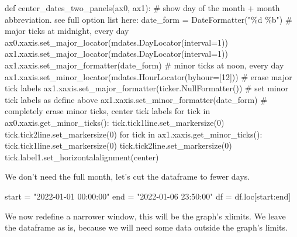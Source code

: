 \documentclass[
  letterpaper,
  DIV=11,
  numbers=noendperiod,
  oneside]{scrreprt}
\newenvironment{Shaded}{\begin{snugshade}}{\end{snugshade}}
\newcommand{\CommentTok}[1]{\textcolor[rgb]{0.37,0.37,0.37}{#1}}
\newcommand{\ControlFlowTok}[1]{\textcolor[rgb]{0.00,0.23,0.31}{#1}}
\newcommand{\DecValTok}[1]{\textcolor[rgb]{0.68,0.00,0.00}{#1}}
\newcommand{\KeywordTok}[1]{\textcolor[rgb]{0.00,0.23,0.31}{#1}}
\newcommand{\NormalTok}[1]{\textcolor[rgb]{0.00,0.23,0.31}{#1}}
\newcommand{\OperatorTok}[1]{\textcolor[rgb]{0.37,0.37,0.37}{#1}}
\newcommand{\SpecialCharTok}[1]{\textcolor[rgb]{0.37,0.37,0.37}{#1}}
\newcommand{\StringTok}[1]{\textcolor[rgb]{0.13,0.47,0.30}{#1}}
\begin{document}
\begin{Shaded}
\begin{Highlighting}[]
\KeywordTok{def}\NormalTok{ center\_dates\_two\_panels(ax0, ax1):}
    \CommentTok{\# show day of the month + month abbreviation. see full option list here:}
\NormalTok{    date\_form }\OperatorTok{=}\NormalTok{ DateFormatter(}\StringTok{"}\SpecialCharTok{\%d}\StringTok{ \%b"}\NormalTok{)}
    \CommentTok{\# major ticks at midnight, every day}
\NormalTok{    ax0.xaxis.set\_major\_locator(mdates.DayLocator(interval}\OperatorTok{=}\DecValTok{1}\NormalTok{))}
\NormalTok{    ax1.xaxis.set\_major\_locator(mdates.DayLocator(interval}\OperatorTok{=}\DecValTok{1}\NormalTok{))}
\NormalTok{    ax1.xaxis.set\_major\_formatter(date\_form)}
    \CommentTok{\# minor ticks at noon, every day}
\NormalTok{    ax1.xaxis.set\_minor\_locator(mdates.HourLocator(byhour}\OperatorTok{=}\NormalTok{[}\DecValTok{12}\NormalTok{]))}
    \CommentTok{\# erase major tick labels}
\NormalTok{    ax1.xaxis.set\_major\_formatter(ticker.NullFormatter())}
    \CommentTok{\# set minor tick labels as define above}
\NormalTok{    ax1.xaxis.set\_minor\_formatter(date\_form)}
    \CommentTok{\# completely erase minor ticks, center tick labels}
    \ControlFlowTok{for}\NormalTok{ tick }\KeywordTok{in}\NormalTok{ ax0.xaxis.get\_minor\_ticks():}
\NormalTok{        tick.tick1line.set\_markersize(}\DecValTok{0}\NormalTok{)}
\NormalTok{        tick.tick2line.set\_markersize(}\DecValTok{0}\NormalTok{)}
    \ControlFlowTok{for}\NormalTok{ tick }\KeywordTok{in}\NormalTok{ ax1.xaxis.get\_minor\_ticks():}
\NormalTok{        tick.tick1line.set\_markersize(}\DecValTok{0}\NormalTok{)}
\NormalTok{        tick.tick2line.set\_markersize(}\DecValTok{0}\NormalTok{)}
\NormalTok{        tick.label1.set\_horizontalalignment(}\StringTok{\textquotesingle{}center\textquotesingle{}}\NormalTok{)}
\end{Highlighting}
\end{Shaded}

We don't need the full month, let's cut the dataframe to fewer days.

\begin{Shaded}
\begin{Highlighting}[]
\NormalTok{start }\OperatorTok{=} \StringTok{"2022{-}01{-}01 00:00:00"}
\NormalTok{end }\OperatorTok{=} \StringTok{"2022{-}01{-}06 23:50:00"}
\NormalTok{df }\OperatorTok{=}\NormalTok{ df.loc[start:end]}
\end{Highlighting}
\end{Shaded}

We now redefine a narrower window, this will be the graph's xlimits. We
leave the dataframe as is, because we will need some data outside the
graph's limits.
\end{document}
